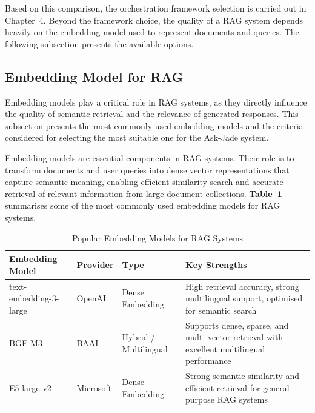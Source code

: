 Based on this comparison, the orchestration framework selection is carried
out in Chapter~4. Beyond the framework choice, the quality of a RAG system
depends heavily on the embedding model used to represent documents and queries.
The following subsection presents the available options.

\subsection{Embedding Model for RAG}

Embedding models play a critical role in RAG systems, as they directly influence the quality of semantic retrieval and the relevance of generated responses. This subsection presents the most commonly used embedding models and the criteria considered for selecting the most suitable one for the Ask-Jade system.

Embedding models are essential components in RAG systems. Their role is to
transform documents and user queries into dense vector representations that
capture semantic meaning, enabling efficient similarity search and accurate
retrieval of relevant information from large document collections.
\textbf{Table~\ref{tab:embedding_popular}} summarises some of the most commonly used
embedding models for RAG systems.

\begin{table}[H]
\centering
\caption{Popular Embedding Models for RAG Systems}
\label{tab:embedding_popular}
\begin{tabular}{|p{4cm}|p{3cm}|p{3cm}|p{5cm}|}
\hline
\textbf{Embedding Model} & \textbf{Provider} & \textbf{Type}
& \textbf{Key Strengths} \\
\hline

text-embedding-3-large~\cite{openai} &
OpenAI &
Dense Embedding &
High retrieval accuracy, strong multilingual support,
optimised for semantic search \\
\hline

BGE-M3~\cite{bge_m3} &
BAAI &
Hybrid / Multilingual &
Supports dense, sparse, and multi-vector retrieval with excellent
multilingual performance \\
\hline

E5-large-v2~\cite{e5_microsoft} &
Microsoft &
Dense Embedding &
Strong semantic similarity and efficient retrieval for general-purpose
RAG systems \\
\hline

\end{tabular}
\end{table}

